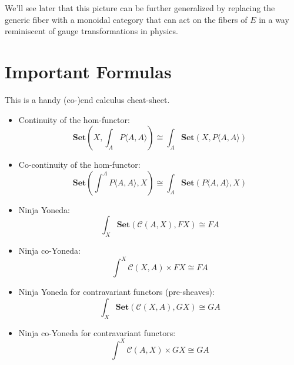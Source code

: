 \documentclass[DaoFP]{subfiles}
\begin{document}
We'll see later that this picture can be further generalized by replacing the generic fiber with a monoidal category that can act on the fibers of $E$ in a way reminiscent of gauge transformations in physics.

\section{Important Formulas}
This is a handy (co-)end calculus cheat-sheet.
\begin{itemize}
\item Continuity of the hom-functor:
\[ \mathbf{Set}\left(X, \int_A P\langle A, A \rangle \right) \cong \int_A  \mathbf{Set}(X, P\langle A, A \rangle) \]
\item Co-continuity of the hom-functor:
\[ \mathbf{Set}\left( \int^A P\langle A, A \rangle , X\right) \cong \int_A  \mathbf{Set}(P\langle A, A \rangle, X) \]
\item Ninja Yoneda:
\[ \int_{X} \mathbf{Set} (\mathcal{C}(A, X), FX) \cong FA \]
\item Ninja co-Yoneda:
\[ \int^{X} \mathcal{C}(X, A) \times F X \cong F A \]
\item Ninja Yoneda for contravariant functors (pre-sheaves):
\[ \int_{X} \mathbf{Set} (\mathcal{C}(X, A), GX) \cong GA \]
\item Ninja co-Yoneda for contravariant functors:
\[ \int^{X} \mathcal{C}(A, X) \times G X \cong G A \]
\end{itemize}
\end{document}
